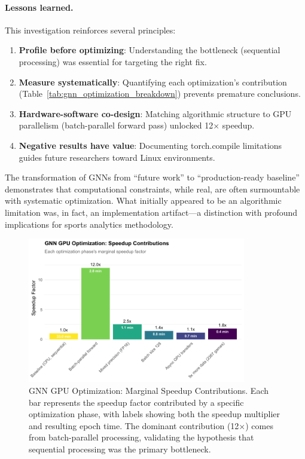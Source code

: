 \paragraph{Lessons learned.} This investigation reinforces several principles:
\begin{enumerate}
    \item \textbf{Profile before optimizing}: Understanding the bottleneck (sequential processing) was essential for targeting the right fix.
    \item \textbf{Measure systematically}: Quantifying each optimization's contribution (Table~\ref{tab:gnn_optimization_breakdown}) prevents premature conclusions.
    \item \textbf{Hardware-software co-design}: Matching algorithmic structure to GPU parallelism (batch-parallel forward pass) unlocked 12$\times$ speedup.
    \item \textbf{Negative results have value}: Documenting torch.compile limitations guides future researchers toward Linux environments.
\end{enumerate}

The transformation of GNNs from ``future work'' to ``production-ready baseline'' demonstrates that computational constraints, while real, are often surmountable with systematic optimization. What initially appeared to be an algorithmic limitation was, in fact, an implementation artifact—a distinction with profound implications for sports analytics methodology.


\begin{figure}[htbp]
\centering
\includegraphics[width=0.85\textwidth]{../figures/out/gnn_speedup_waterfall.pdf}
\caption{GNN GPU Optimization: Marginal Speedup Contributions. Each bar represents the speedup factor contributed by a specific optimization phase, with labels showing both the speedup multiplier and resulting epoch time. The dominant contribution (12$\times$) comes from batch-parallel processing, validating the hypothesis that sequential processing was the primary bottleneck.}
\label{fig:gnn_speedup_waterfall}
\end{figure}

